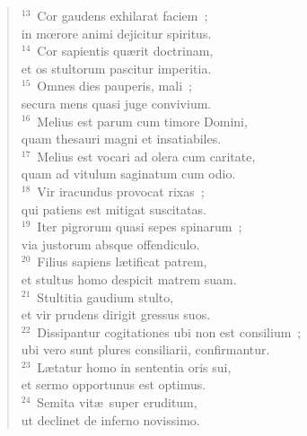 \begin{flushleft}\begin{verse}${}^{13}$~Cor gaudens exhilarat faciem~;\\ in mœrore animi dejicitur spiritus.\\
${}^{14}$~Cor sapientis qu\ae rit doctrinam,\\ et os stultorum pascitur imperitia.\\
${}^{15}$~Omnes dies pauperis, mali~;\\ secura mens quasi juge convivium.\\
${}^{16}$~Melius est parum cum timore Domini,\\ quam thesauri magni et insatiabiles.\\
${}^{17}$~Melius est vocari ad olera cum caritate,\\ quam ad vitulum saginatum cum odio.\\
${}^{18}$~Vir iracundus provocat rixas~;\\ qui patiens est mitigat suscitatas.\\
${}^{19}$~Iter pigrorum quasi sepes spinarum~;\\ via justorum absque offendiculo.\\
${}^{20}$~Filius sapiens l\ae tificat patrem,\\ et stultus homo despicit matrem suam.\\
${}^{21}$~Stultitia gaudium stulto,\\ et vir prudens dirigit gressus suos.\\
${}^{22}$~Dissipantur cogitationes ubi non est consilium~;\\ ubi vero sunt plures consiliarii, confirmantur.\\
${}^{23}$~L\ae tatur homo in sententia oris sui,\\ et sermo opportunus est optimus.\\
${}^{24}$~Semita vit\ae\ super eruditum,\\ ut declinet de inferno novissimo.\end{verse}\end{flushleft}


